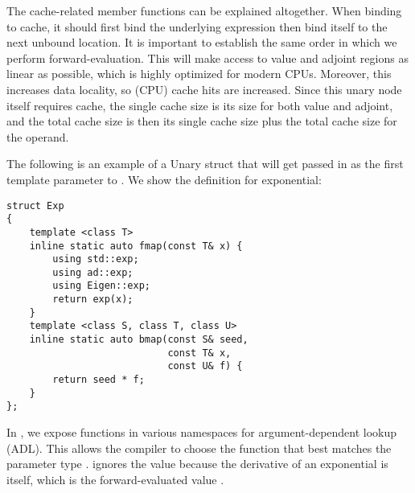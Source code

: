 The cache-related member functions can be explained altogether.
When binding to cache, it should first bind the underlying 
expression then bind itself to the next unbound location.
It is important to establish the same order in which we perform forward-evaluation.
This will make access to value and adjoint regions as linear as possible,
which is highly optimized for modern CPUs.
Moreover, this increases data locality, so (CPU) cache hits are increased.
Since this unary node itself requires cache,
the single cache size is its size for both value and adjoint,
and the total cache size is then its single cache size plus
the total cache size for the operand.

The following is an example of a Unary struct that will get passed in 
as the first template parameter to .
We show the definition for exponential:
\begin{lstlisting}[style=customcpp]
struct Exp
{
    template <class T>
	inline static auto fmap(const T& x) {
        using std::exp;
        using ad::exp;
        using Eigen::exp;
        return exp(x);
	}
    template <class S, class T, class U> 
	inline static auto bmap(const S& seed,
                            const T& x,
                            const U& f) {
        return seed * f;
	}
};
\end{lstlisting}
In , we expose  functions in various namespaces for argument-dependent lookup (ADL).
This allows the compiler to choose the  function that best matches
the parameter type .
 ignores the  value because the derivative of an exponential
is itself, which is the forward-evaluated value .

